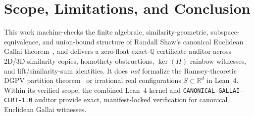 \documentclass[11pt,twocolumn]{article}
\newcommand{\QQ}{\mathbb{Q}}
\begin{document}
\section{Scope, Limitations, and Conclusion}\label{sec:conclusion}
This work machine-checks the finite algebraic, similarity-geometric, subspace-equivalence, and union-bound structure of Randall Shaw's canonical Euclidean Gallai theorem~\cite{randallshaw2026gallai}, and delivers a zero-float exact-$\QQ$ certificate auditor across 2D/3D similarity copies, homothety obstructions, $\ker(H)$ rainbow witnesses, and lift/similarity-sum identities. It does \emph{not} formalize the Ramsey-theoretic DGPV partition theorem~\cite{deuber1983canonical} or irrational real configurations $S \subset \mathbb{R}^d$ in Lean~4. Within its verified scope, the combined Lean~4 kernel and \texttt{CANONICAL-GALLAI-CERT-1.0} auditor provide exact, manifest-locked verification for canonical Euclidean Gallai witnesses.



\end{document}
